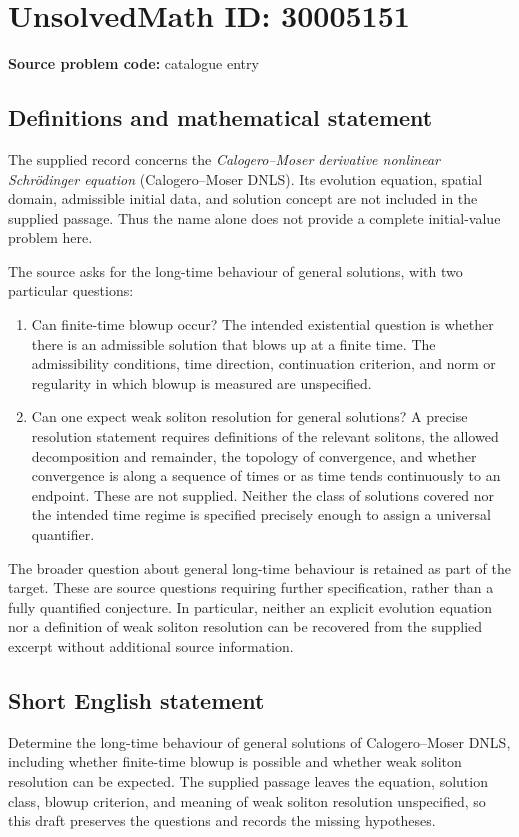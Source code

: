 \documentclass[11pt]{article}
\begin{document}
\section*{UnsolvedMath ID: 30005151}
\textbf{Source problem code:} catalogue entry
\subsection{Definitions and mathematical statement}
The supplied record concerns the \emph{Calogero--Moser derivative nonlinear Schrödinger equation} (Calogero--Moser DNLS). Its evolution equation, spatial domain, admissible initial data, and solution concept are not included in the supplied passage. Thus the name alone does not provide a complete initial-value problem here.

The source asks for the long-time behaviour of general solutions, with two particular questions:
\begin{enumerate}
\item Can finite-time blowup occur? The intended existential question is whether there is an admissible solution that blows up at a finite time. The admissibility conditions, time direction, continuation criterion, and norm or regularity in which blowup is measured are unspecified.
\item Can one expect weak soliton resolution for general solutions? A precise resolution statement requires definitions of the relevant solitons, the allowed decomposition and remainder, the topology of convergence, and whether convergence is along a sequence of times or as time tends continuously to an endpoint. These are not supplied. Neither the class of solutions covered nor the intended time regime is specified precisely enough to assign a universal quantifier.
\end{enumerate}
The broader question about general long-time behaviour is retained as part of the target. These are source questions requiring further specification, rather than a fully quantified conjecture. In particular, neither an explicit evolution equation nor a definition of weak soliton resolution can be recovered from the supplied excerpt without additional source information.
\subsection{Short English statement}
Determine the long-time behaviour of general solutions of Calogero--Moser DNLS, including whether finite-time blowup is possible and whether weak soliton resolution can be expected. The supplied passage leaves the equation, solution class, blowup criterion, and meaning of weak soliton resolution unspecified, so this draft preserves the questions and records the missing hypotheses.
\end{document}
